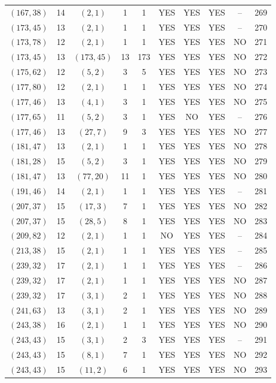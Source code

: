 \begin{longtable}{|c|c|c|c|c|c|c|c|c|c|}
$(167, 38)$ & 14 & $(2, 1)$ & 1 & 1 & YES & YES & YES & -- & 269\\
$(173, 45)$ & 13 & $(2, 1)$ & 1 & 1 & YES & YES & YES & -- & 270\\
$(173, 78)$ & 12 & $(2, 1)$ & 1 & 1 & YES & YES & YES & NO & 271\\
$(173, 45)$ & 13 & $(173, 45)$ & 13 & 173 & YES & YES & YES & NO & 272\\
$(175, 62)$ & 12 & $(5, 2)$ & 3 & 5 & YES & YES & YES & NO & 273\\
$(177, 80)$ & 12 & $(2, 1)$ & 1 & 1 & YES & YES & YES & NO & 274\\
$(177, 46)$ & 13 & $(4, 1)$ & 3 & 1 & YES & YES & YES & NO & 275\\
$(177, 65)$ & 11 & $(5, 2)$ & 3 & 1 & YES & NO & YES & -- & 276\\
$(177, 46)$ & 13 & $(27, 7)$ & 9 & 3 & YES & YES & YES & NO & 277\\
$(181, 47)$ & 13 & $(2, 1)$ & 1 & 1 & YES & YES & YES & NO & 278\\
$(181, 28)$ & 15 & $(5, 2)$ & 3 & 1 & YES & YES & YES & NO & 279\\
$(181, 47)$ & 13 & $(77, 20)$ & 11 & 1 & YES & YES & YES & NO & 280\\
$(191, 46)$ & 14 & $(2, 1)$ & 1 & 1 & YES & YES & YES & -- & 281\\
$(207, 37)$ & 15 & $(17, 3)$ & 7 & 1 & YES & YES & YES & NO & 282\\
$(207, 37)$ & 15 & $(28, 5)$ & 8 & 1 & YES & YES & YES & NO & 283\\
$(209, 82)$ & 12 & $(2, 1)$ & 1 & 1 & NO & YES & YES & -- & 284\\
$(213, 38)$ & 15 & $(2, 1)$ & 1 & 1 & YES & YES & YES & -- & 285\\
$(239, 32)$ & 17 & $(2, 1)$ & 1 & 1 & YES & YES & YES & -- & 286\\
$(239, 32)$ & 17 & $(2, 1)$ & 1 & 1 & YES & YES & YES & NO & 287\\
$(239, 32)$ & 17 & $(3, 1)$ & 2 & 1 & YES & YES & YES & NO & 288\\
$(241, 63)$ & 13 & $(3, 1)$ & 2 & 1 & YES & YES & YES & NO & 289\\
$(243, 38)$ & 16 & $(2, 1)$ & 1 & 1 & YES & YES & YES & NO & 290\\
$(243, 43)$ & 15 & $(3, 1)$ & 2 & 3 & YES & YES & YES & -- & 291\\
$(243, 43)$ & 15 & $(8, 1)$ & 7 & 1 & YES & YES & YES & NO & 292\\
$(243, 43)$ & 15 & $(11, 2)$ & 6 & 1 & YES & YES & YES & NO & 293\\

\end{longtable}
